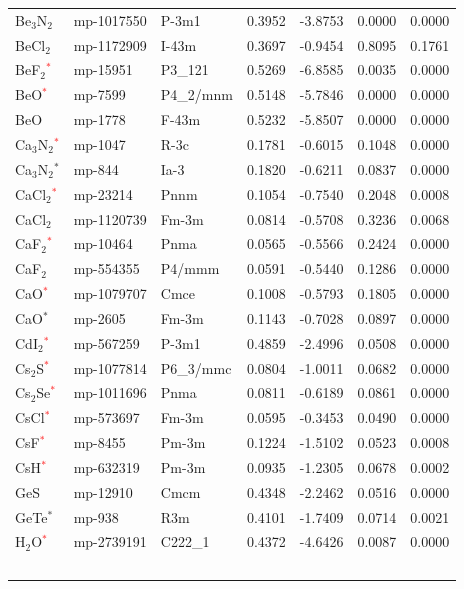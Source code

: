 \begin{longtable}{@{}lllrrrr@{}}
Be$_{3}$N$_{2}$ & mp-1017550 & P-3m1 & 0.3952 & -3.8753 & 0.0000 & 0.0000 \\
BeCl$_{2}$ & mp-1172909 & I-43m & 0.3697 & -0.9454 & 0.8095 & 0.1761 \\
BeF$_{2}$\textcolor{red}{$^*$} & mp-15951 & P3\_121 & 0.5269 & -6.8585 & 0.0035 & 0.0000 \\
BeO\textcolor{red}{$^*$} & mp-7599 & P4\_2/mnm & 0.5148 & -5.7846 & 0.0000 & 0.0000 \\
BeO & mp-1778 & F-43m & 0.5232 & -5.8507 & 0.0000 & 0.0000 \\
Ca$_{3}$N$_{2}$\textcolor{red}{$^*$} & mp-1047 & R-3c & 0.1781 & -0.6015 & 0.1048 & 0.0000 \\
Ca$_{3}$N$_{2}$$^*$ & mp-844 & Ia-3 & 0.1820 & -0.6211 & 0.0837 & 0.0000 \\
CaCl$_{2}$\textcolor{red}{$^*$} & mp-23214 & Pnnm & 0.1054 & -0.7540 & 0.2048 & 0.0008 \\
CaCl$_{2}$ & mp-1120739 & Fm-3m & 0.0814 & -0.5708 & 0.3236 & 0.0068 \\
CaF$_{2}$\textcolor{red}{$^*$} & mp-10464 & Pnma & 0.0565 & -0.5566 & 0.2424 & 0.0000 \\
CaF$_{2}$ & mp-554355 & P4/mmm & 0.0591 & -0.5440 & 0.1286 & 0.0000 \\
CaO\textcolor{red}{$^*$} & mp-1079707 & Cmce & 0.1008 & -0.5793 & 0.1805 & 0.0000 \\
CaO$^*$ & mp-2605 & Fm-3m & 0.1143 & -0.7028 & 0.0897 & 0.0000 \\
CdI$_{2}$\textcolor{red}{$^*$} & mp-567259 & P-3m1 & 0.4859 & -2.4996 & 0.0508 & 0.0000 \\
Cs$_{2}$S\textcolor{red}{$^*$} & mp-1077814 & P6\_3/mmc & 0.0804 & -1.0011 & 0.0682 & 0.0000 \\
Cs$_{2}$Se\textcolor{red}{$^*$} & mp-1011696 & Pnma & 0.0811 & -0.6189 & 0.0861 & 0.0000 \\
CsCl\textcolor{red}{$^*$} & mp-573697 & Fm-3m & 0.0595 & -0.3453 & 0.0490 & 0.0000 \\
CsF\textcolor{red}{$^*$} & mp-8455 & Pm-3m & 0.1224 & -1.5102 & 0.0523 & 0.0008 \\
CsH\textcolor{red}{$^*$} & mp-632319 & Pm-3m & 0.0935 & -1.2305 & 0.0678 & 0.0002 \\
GeS & mp-12910 & Cmcm & 0.4348 & -2.2462 & 0.0516 & 0.0000 \\
GeTe$^*$ & mp-938 & R3m & 0.4101 & -1.7409 & 0.0714 & 0.0021 \\
H$_{2}$O\textcolor{red}{$^*$} & mp-2739191 & C222\_1 & 0.4372 & -4.6426 & 0.0087 & 0.0000 \\
$$
\end{longtable}
